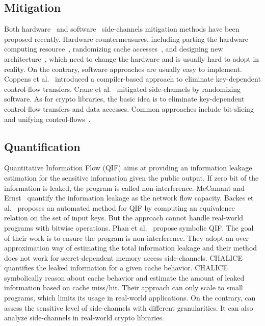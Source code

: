 \subsection{Mitigation}
Both hardware~\cite{Page2005PartitionedCA,
Wang:2007:NCD:1250662.1250723,Zhang:2015:HDL:2775054.2694372,Li:2014:SLH:2541940.2541947,
236344} and software~\cite{shih2017t,Coppens:2009:PMT:1607723.1608124,
brickell2006software,crane2015thwarting} side-channels mitigation methods have
been proposed recently. Hardware countermeasures, including parting the hardware
computing resource~\cite{Page2005PartitionedCA}, randomizing cache
accesses~\cite{Wang:2007:NCD:1250662.1250723, 236344}, and designing new
architecture~\cite{tiwari2011crafting}, which need to change the hardware and is
usually hard to adopt in reality. On the contrary, software approaches are
usually easy to implement. Coppens et
al.~\cite{Coppens:2009:PMT:1607723.1608124} introduced a compiler-based approach
to eliminate key-dependent control-flow transfers. Crane et
al.~\cite{crane2015thwarting} mitigated side-channels by randomizing software.
As for crypto libraries, the basic idea is to eliminate key-dependent
control-flow transfers and data accesses. Common approaches include
bit-slicing~\cite{konighofer2008fast,rebeiro2006bitslice} and unifying
control-flows~\cite{Coppens:2009:PMT:1607723.1608124}.

\subsection{Quantification}

Quantitative Information Flow (QIF) aims at providing an information leakage
estimation for the sensitive information given the public output. If zero bit
of the information is leaked, the program is called non-interference. McCamant
and Ernst~\cite{McCamantE2008} quantify the information leakage as the network
flow capacity. Backes et al.~\cite{5207642} proposes an automated method for QIF
by computing an equivalence relation on the set of input keys. But the approach
cannot handle real-world programs with bitwise operations. Phan et
al.~\cite{Phan:2012:SQI:2382756.2382791} propose symbolic QIF. The goal of their
work is to ensure the program is non-interference. They adopt an over
approximation way of estimating the total information leakage and their method
does not work for secret-dependent memory access side-channels.
CHALICE~\cite{Chattopadhyay:2017:QIL:3127041.3127044} quantifies the leaked
information for a given cache behavior. CHALICE symbolically reason about cache
behavior and estimate the amount of leaked information based on cache miss/hit.
Their approach can only scale to small programs, which limits its usage in
real-world applications. On the contrary, \tool{} can assess the sensitive level
of side-channels with different granularities. It can also analyze side-channels
in real-world crypto libraries.



